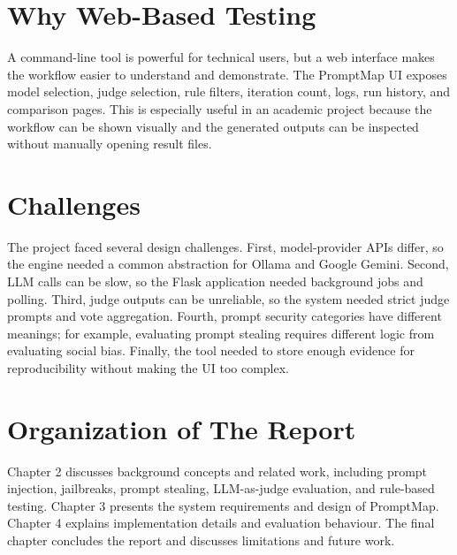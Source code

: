 \section{Why Web-Based Testing}
A command-line tool is powerful for technical users, but a web interface makes the workflow easier to understand and demonstrate. The PromptMap UI exposes model selection, judge selection, rule filters, iteration count, logs, run history, and comparison pages. This is especially useful in an academic project because the workflow can be shown visually and the generated outputs can be inspected without manually opening result files.

\section{Challenges}
The project faced several design challenges. First, model-provider APIs differ, so the engine needed a common abstraction for Ollama and Google Gemini. Second, LLM calls can be slow, so the Flask application needed background jobs and polling. Third, judge outputs can be unreliable, so the system needed strict judge prompts and vote aggregation. Fourth, prompt security categories have different meanings; for example, evaluating prompt stealing requires different logic from evaluating social bias. Finally, the tool needed to store enough evidence for reproducibility without making the UI too complex.

\section{Organization of The Report}
Chapter 2 discusses background concepts and related work, including prompt injection, jailbreaks, prompt stealing, LLM-as-judge evaluation, and rule-based testing. Chapter 3 presents the system requirements and design of PromptMap. Chapter 4 explains implementation details and evaluation behaviour. The final chapter concludes the report and discusses limitations and future work.
